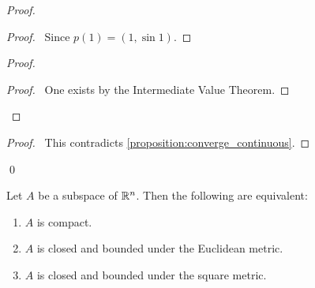\begin{proof}
    \pf
    \begin{proof}
        \pf\ Since $p(1) = (1, \sin 1)$.
    \end{proof}
    \step{4}{\pick\ a sequence $(t_n)_{n \geq 1}$ in $(b,1]$ such that $t_n \rightarrow b$ and $\pi_2(p(t_n)) = (-1)^n$}
    \begin{proof}
        \begin{proof}
            \pf\ One exists by the Intermediate Value Theorem.
        \end{proof}
    \end{proof}
    \qedstep
    \begin{proof}
        \pf\ This contradicts \ref{proposition:converge_continuous}.
    \end{proof}
    \qed
\end{proof}

\begin{theorem}
    Let $A$ be a subspace of $\mathbb{R}^n$. Then the following are equivalent:
    \begin{enumerate}
        \item $A$ is compact.
        \item $A$ is closed and bounded under the Euclidean metric.
        \item $A$ is closed and bounded under the square metric.
    \end{enumerate}
\end{theorem}


